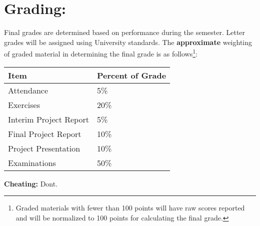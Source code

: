 \documentclass[12pt]{article}
\begin{document}
\section*{Grading:} Final grades are determined based on performance during the semester.  Letter grades will be assigned using University standards.  The \textbf{approximate} weighting of graded material in determining the final grade is as follows\footnote{Graded materials with fewer than 100 points will have raw scores reported and will be normalized to 100 points for calculating the final grade.}:
\begin{table}[h!]
   \centering
   \begin{tabular}{l l}
Item & Percent of Grade \\
\hline
\hline
Attendance & 5\% \\
Exercises & 20\% \\
Interim Project Report & 5\% \\
Final Project Report & 10\% \\
Project Presentation & 10\% \\
Examinations & 50\% \\
\hline
\end{tabular}
\end{table}

\textbf{Cheating:} Dont.

\clearpage
\end{document}
